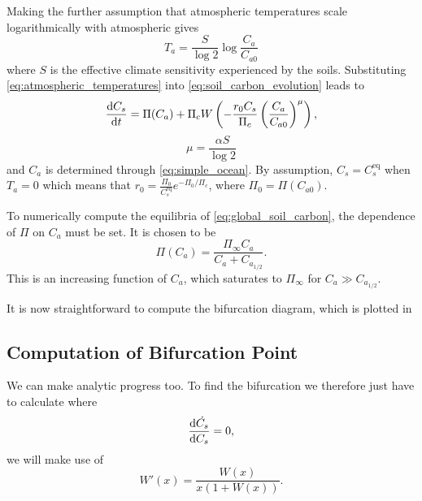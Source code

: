 Making the further assumption that atmospheric temperatures scale logarithmically with atmospheric  \parencite{Pierrehumbert2010} gives
\begin{equation}
  \label{eq:atmospheric_temperatures}
  T_a = \frac{S}{\log 2} \log \frac{C_a}{C_{a0}} 
\end{equation}
where $S$ is the effective climate sensitivity experienced by the soils. Substituting \cref{eq:atmospheric_temperatures} into \cref{eq:soil_carbon_evolution} 
leads to
\begin{equation}
  \label{eq:global_soil_carbon}
  \dv{C_s}{t} = \Pi(C_a) + \Pi_c W\left(-\frac{r_0C_s}{\Pi_c} \left(\frac{C_a}{C_{a0}}\right)^\mu \right),
\end{equation}
\begin{equation}
  \label{eq:mu}
  \mu = \frac{\alpha S}{\log 2}
\end{equation}
and $C_a$ is determined through \cref{eq:simple_ocean}. By assumption, $C_s = C_s^{\mathrm{eq}}$ when $T_a = 0$ which means that 
$r_0 = \frac{\Pi_0}{C_s^{\mathrm{eq}}}e^{-\Pi_0/\Pi_c}$, where $\Pi_0 = \Pi\left(C_{a0}\right)$.

To numerically compute the equilibria of \cref{eq:global_soil_carbon}, the dependence of $\Pi$ on
$C_a$  must be set. It is chosen to be
\begin{equation}
  \label{eq:npp_fertilization}
  \Pi(C_a) = \frac{\Pi_{\infty} C_a}{C_a + C_{a_{1/2}}}.
\end{equation}
This is an increasing function of $C_a$, which saturates to $\Pi_{\infty}$ for $C_a \gg C_{a_{1/2}}$.

It is now straightforward to compute the bifurcation diagram, which is plotted in  

\subsection{Computation of Bifurcation Point}
We can make analytic progress too. To find the bifurcation we therefore just have to calculate where
\begin{equation*}
  \dv{\dot{C_s}}{C_s} = 0,
\end{equation*}
we will make use of
\begin{equation}
  \label{eq:derivative_of_lambert_W}
  W'(x) = \frac{W(x)}{x\left(1 + W\left(x\right)\right)}.
\end{equation}




